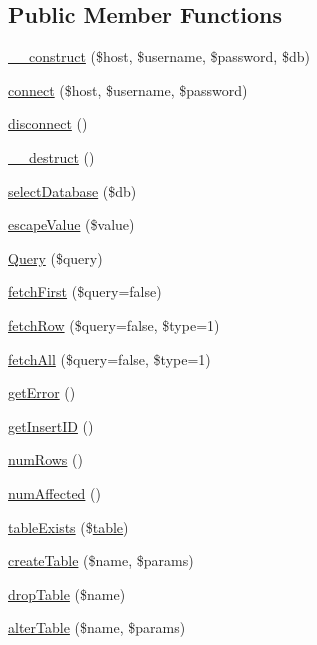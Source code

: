 \subsection*{Public Member Functions}
\begin{DoxyCompactItemize}
\item 
\hyperlink{class_my_s_q_li_database_a81fcddb424f13e0862ee3f7e1ea57ce9}{\_\-\_\-construct} (\$host, \$username, \$password, \$db)
\item 
\hyperlink{class_my_s_q_li_database_a4c4f3316747e665b9e02f6ddcba4117c}{connect} (\$host, \$username, \$password)
\item 
\hyperlink{class_my_s_q_li_database_abe175fcf658475bc56e9d6fa02bc88ec}{disconnect} ()
\item 
\hyperlink{class_my_s_q_li_database_a421831a265621325e1fdd19aace0c758}{\_\-\_\-destruct} ()
\item 
\hyperlink{class_my_s_q_li_database_ab624b0b234f9db9dbc6dc4180f566b1f}{selectDatabase} (\$db)
\item 
\hyperlink{class_my_s_q_li_database_a039ae2e8f2bf579fd75d9df8df87eee3}{escapeValue} (\$value)
\item 
\hyperlink{class_my_s_q_li_database_aebc962126fd37fd3478c4689156d5f83}{Query} (\$query)
\item 
\hyperlink{class_my_s_q_li_database_a3e35f6f5604ebbf57a86508c708bd33c}{fetchFirst} (\$query=false)
\item 
\hyperlink{class_my_s_q_li_database_acdee1c4e55c3792b3dbfeedfac35912f}{fetchRow} (\$query=false, \$type=1)
\item 
\hyperlink{class_my_s_q_li_database_a1750ab2493620de034b80a77577f3e8b}{fetchAll} (\$query=false, \$type=1)
\item 
\hyperlink{class_my_s_q_li_database_a24ada5decce3d1b79cd82f5a90ccf404}{getError} ()
\item 
\hyperlink{class_my_s_q_li_database_ac73f1d8cddbdfc35ca442189378a073c}{getInsertID} ()
\item 
\hyperlink{class_my_s_q_li_database_af37433a300db1f607ee789d22828a0a0}{numRows} ()
\item 
\hyperlink{class_my_s_q_li_database_acac8dfe61e7840f9a1e672ebede0be21}{numAffected} ()
\item 
\hyperlink{class_my_s_q_li_database_ae7cdaa744d52a1eb0103e377023ca528}{tableExists} (\$\hyperlink{classtable}{table})
\item 
\hyperlink{class_my_s_q_li_database_a4b06dfe3bf7dd552f828a80fece817d8}{createTable} (\$name, \$params)
\item 
\hyperlink{class_my_s_q_li_database_a3471d37afdd3d76f5379dfe7364db0b6}{dropTable} (\$name)
\item 
\hyperlink{class_my_s_q_li_database_aa8cf3e2be109e548bed6980622fffb41}{alterTable} (\$name, \$params)
\end{DoxyCompactItemize}

